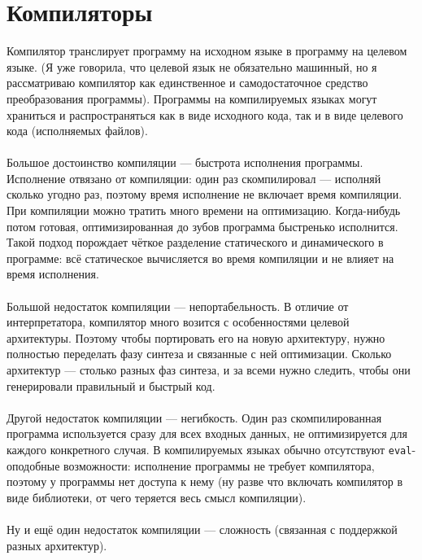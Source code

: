 \documentclass[11pt]{book}
\begin{document}
\section{Компиляторы}
Компилятор транслирует программу на исходном языке в программу на целевом языке.
(Я уже говорила, что целевой язык не обязательно машинный, но я рассматриваю
компилятор как единственное и самодостаточное средство преобразования программы).
Программы на компилируемых языках могут храниться и распространяться как в виде исходного кода,
так и в виде целевого кода (исполняемых файлов).
\\ \\
Большое достоинство компиляции --- быстрота исполнения программы.
Исполнение отвязано от компиляции: один раз скомпилировал --- исполняй сколько угодно раз,
поэтому время исполнение не включает время компиляции.
При компиляции можно тратить много времени на оптимизацию.
Когда-нибудь потом готовая, оптимизированная до зубов программа быстренько исполнится.
Такой подход порождает чёткое разделение статического и динамического в программе:
всё статическое вычисляется во время компиляции и не влияет на время исполнения.
\\ \\
Большой недостаток компиляции --- непортабельность.
В отличие от интерпретатора, компилятор много возится с особенностями целевой архитектуры.
Поэтому чтобы портировать его на новую архитектуру, нужно полностью переделать фазу синтеза и связанные с ней оптимизации.
Сколько архитектур --- столько разных фаз синтеза, и за всеми нужно следить, чтобы они генерировали правильный и быстрый код.
\\ \\
Другой недостаток компиляции --- негибкость.
Один раз скомпилированная программа используется сразу для всех входных данных, не оптимизируется для каждого конкретного случая.
В компилируемых языках обычно отсутствуют \texttt{eval}-оподобные возможности:
исполнение программы не требует компилятора, поэтому у программы нет доступа к нему
(ну разве что включать компилятор в виде библиотеки, от чего теряется весь смысл компиляции).
\\ \\
Ну и ещё один недостаток компиляции --- сложность (связанная с поддержкой разных архитектур).
\end{document}
